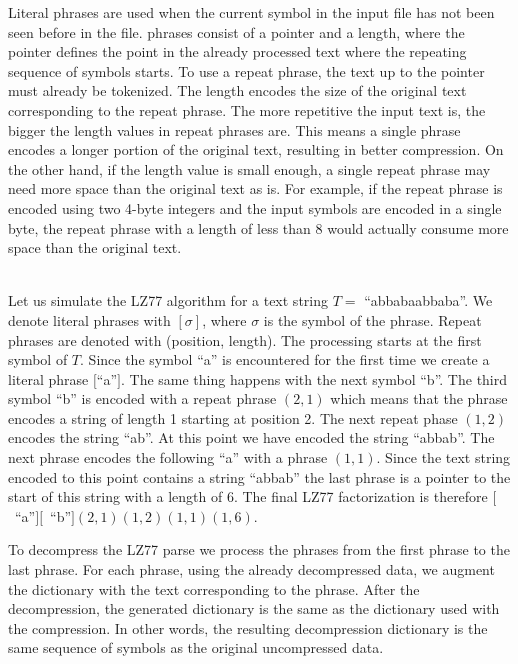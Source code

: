 \documentclass[english,twoside,censored,csm,algorithms-track-2020]{HYthesisML}
\theoremstyle{plain}
\theoremstyle{definition}
\newcounter{testexample}
\numberwithin{testexample}{chapter}
\begin{document}
Literal phrases are used when the current symbol in the input file has not been seen before in the file.
phrases consist of a pointer and a length, where the pointer defines the point in the already
processed text where the repeating sequence of symbols starts. To use a repeat phrase, the text up
to the pointer must already be tokenized.
The length encodes the size of the original text
corresponding to the repeat phrase. The more repetitive the input text is, the bigger the length
values in repeat phrases are. This means a single phrase encodes a longer portion of the original
text, resulting in better compression. On the other hand, if the length value is small enough,
a single repeat phrase may need more space than the original text as is. For example,
if the repeat phrase is encoded using two 4-byte integers and the input symbols are encoded in a
single byte, the repeat phrase with a length of less than 8 would actually
consume more space than the original text.


\begin{testexample}\\
  Let us simulate the LZ77 algorithm for a text string $T=$ ``abbabaabbaba''. We denote literal phrases
  with $[\sigma]$, where $\sigma$ is the symbol of the phrase. Repeat phrases are denoted
  with (position, length). The processing starts
  at the first symbol of $T$. Since the symbol ``a'' is encountered for the first time we create a
  literal phrase $[$``a''$]$. The same thing happens with the next symbol ``b''. The third symbol ``b'' is
  encoded with a repeat phrase $(2,1)$ which means that the phrase encodes a string of length 1 starting
  at position 2. The next repeat phase $(1,2)$ encodes the string ``ab''. At this point we have encoded
  the string ``abbab''. The next phrase encodes the following ``a'' with a phrase $(1,1)$. Since
  the text string encoded to this point contains a string ``abbab'' the last phrase is a pointer
  to the start of this string with a length of 6. The final LZ77 factorization is therefore
  \hbox{$[$ ``a''$][$ ``b''$](2,1)(1,2)(1,1)(1,6)$.}
\end{testexample}

To decompress the LZ77 parse we process the phrases from the first phrase to the last phrase. For each
phrase, using the already decompressed data, we augment the dictionary with the text corresponding
to the phrase. After the decompression, the generated dictionary is the same as the dictionary used
with the compression. In other words, the resulting decompression dictionary is the same sequence
of symbols as the original uncompressed data. 
\end{document}
